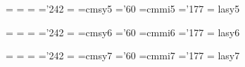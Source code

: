 

\newif\if@usecmsy \@usecmsytrue	%
\newif\if@usecmmi \@usecmmitrue	%
\newif\if@uselasy \@uselasytrue	%

\def\@msyten{cmsy10}
\def\@mmiten{cmmi10}
\def\@lasyten{lasy10}

\def\@font#1#2{\def#1{\global\font#1=#2#1}}
\def\@ttfont#1#2{\def#1{\global\font#1=#2#1\hyphenchar#1=-1}}

\def\@loadcmsy#1#2{\if@usecmsy \font#1=#2 \skewchar#1='60 \fi}
\def\@loadcmmi#1#2{\if@usecmmi \font#1=#2 \skewchar#1='177 \fi}
\def\@loadsy#1#2{\font#1=#2 \skewchar#1='242 }
\def\@loadtt#1#2{\font#1=#2 \hyphenchar#1=-1 }


 \font\fivrm  =  \@rm{}
 \font\fivit  =  \@it{}
 \@loadsy\fivsy	{\@sy\@ptscale5}
 \@font\fivbf	{\@bf\@ptscale5}
 \@font\fivsl	{\@sl\@ptscale5}
 \@ttfont\fivtt	{\@tt\@ptscale5}
 \@font\fivsf	{\@sf\@ptscale5}
 \@font\fivsc	{\@sc\@ptscale5}
 \font\fivms  =  \@ms{}
 \@loadcmsy\fivcmsy{cmsy5}
 \@loadcmmi\fivmi{cmmi5}
 \font\fivly  =  lasy5

 \font\sixrm  =  \@rm{}
 \font\sixit  =  \@it{}
 \@loadsy\sixsy	{\@sy\@ptscale6}
 \@font\sixbf	{\@bf\@ptscale6}
 \@font\sixsl	{\@sl\@ptscale6}
 \@ttfont\sixtt	{\@tt\@ptscale6}
 \@font\sixsf	{\@sf\@ptscale6}
 \@font\sixsc	{\@sc\@ptscale6}
 \font\sixms  =  \@ms{}
 \@loadcmsy\sixcmsy{cmsy6}
 \@loadcmmi\sixmi{cmmi6}
 \font\sixly  =  lasy6

 \font\sevrm  =  \@rm{}
 \font\sevit  =  \@it{}
 \@loadsy\sevsy	{\@sy\@ptscale7}
 \@font\sevbf	{\@bf\@ptscale7}
 \@font\sevsl	{\@sl\@ptscale7}
 \@ttfont\sevtt	{\@tt\@ptscale7}
 \@font\sevsf	{\@sf\@ptscale7}
 \@font\sevsc	{\@sc\@ptscale7}
 \font\sevms  =  \@ms{}
 \@loadcmsy\sevcmsy{cmsy7}
 \@loadcmmi\sevmi{cmmi7}
 \font\sevly  =  lasy7

